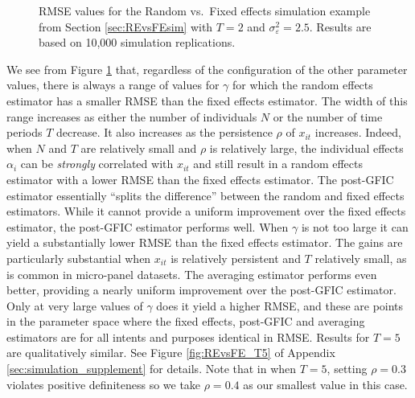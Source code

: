 \begin{figure}[htbp]
  \centering
  
  \caption{RMSE values for the Random vs.\ Fixed effects simulation example from Section \ref{sec:REvsFEsim} with $T=2$ and  $\sigma_{\varepsilon}^2 = 2.5$. Results are based on 10,000 simulation replications.}
  \label{fig:REvsFE_T2}
\end{figure}

We see from Figure \ref{fig:REvsFE_T2} that, regardless of the configuration of the other parameter values, there is always a range of values for $\gamma$ for which the random effects estimator has a smaller RMSE than the fixed effects estimator.
The width of this range increases as either the number of individuals $N$ or the number of time periods $T$ decrease.
It also increases as the persistence $\rho$ of $x_{it}$ increases.
Indeed, when $N$ and $T$ are relatively small and $\rho$ is relatively large, the individual effects $\alpha_{i}$ can be \emph{strongly} correlated with $x_{it}$ and still result in a random effects estimator with a lower RMSE than the fixed effects estimator. 
The post-GFIC estimator essentially ``splits the difference'' between the random and fixed effects estimators.
While it cannot provide a uniform improvement over the fixed effects estimator, the post-GFIC estimator performs well.
When $\gamma$ is not too large it can yield a substantially lower RMSE than the fixed effects estimator.
The gains are particularly substantial when $x_{it}$ is relatively persistent and $T$ relatively small, as is common in micro-panel datasets.
The averaging estimator performs even better, providing a nearly uniform improvement over the post-GFIC estimator.
Only at very large values of $\gamma$ does it yield a higher RMSE, and these are points in the parameter space where the fixed effects, post-GFIC and averaging estimators are for all intents and purposes identical in RMSE.
Results for $T=5$ are qualitatively similar.
See Figure \ref{fig:REvsFE_T5} of Appendix \ref{sec:simulation_supplement} for details.
Note that in when $T=5$, setting $\rho = 0.3$ violates positive definiteness so we take $\rho=0.4$ as our smallest value in this case.


